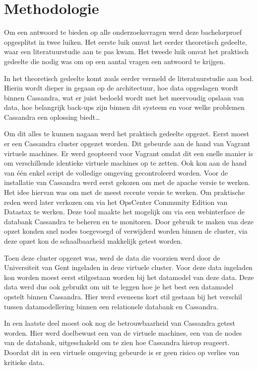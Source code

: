 \chapter{Methodologie}
\label{ch:methodologie}


Om een antwoord te bieden op alle onderzoeksvragen werd deze bachelorproef opgesplitst in twee luiken.
Het eerste luik omvat het eerder theoretisch gedeelte, waar een literatuurstudie aan te pas kwam.
Het tweede luik omvat het praktisch gedeelte die nodig was om op een aantal vragen een antwoord te krijgen.

In het theoretisch gedeelte komt zoals eerder vermeld de literatuurstudie aan bod.
Hierin wordt dieper in gegaan op de architectuur, hoe data opgeslagen wordt binnen Cassandra, wat er juist bedoeld wordt met het meervoudig opslaan van data, hoe belangrijk back-ups zijn binnen dit systeem en voor welke problemen Cassandra een oplossing biedt\dots

Om dit alles te kunnen nagaan werd het praktisch gedeelte opgezet.
Eerst moest er een Cassandra cluster opgezet worden.
Dit gebeurde aan de hand van Vagrant virtuele machines.
Er werd geopteerd voor Vagrant omdat dit een snelle manier is om verschillende identieke virtuele machines op te zetten.
Ook kon aan de hand van één enkel script de volledige omgeving gecontroleerd worden.
Voor de installatie van Cassandra werd eerst gekozen om met de apache versie te werken.
Het idee hiervan was om met de meest recente versie te werken.
Om praktische reden werd later verkozen om via het OpsCenter Community Edition van Datastax te werken.
Deze tool maakte het mogelijk om via een webinterface de databank Cassandra te beheren en te monitoren.
Door gebruik te maken van deze opzet konden snel nodes toegevoegd of verwijderd worden binnen de cluster, via deze opzet kon de schaalbaarheid makkelijk getest worden.

Toen deze cluster opgezet was, werd de data die voorzien werd door de Universiteit van Gent ingeladen in deze virtuele cluster.
Voor deze data ingeladen kon worden moest eerst stilgestaan worden bij het datamodel van deze data.
Deze data werd dus ook gebruikt om uit te leggen hoe je het best een datamodel opstelt binnen Cassandra.
Hier werd eveneens kort stil gestaan bij het verschil tussen datamodellering binnen een relationele databank en Cassandra. 

In een laatste deel moest ook nog de betrouwbaarheid van Cassandra getest worden.
Hier werd doelbewust een van de virtuele machines, een van de nodes van de databank, uitgeschakeld om te zien hoe Cassandra hierop reageert.
Doordat dit in een virtuele omgeving gebeurde is er geen risico op verlies van kritieke data.
